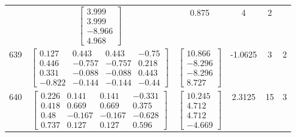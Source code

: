\documentclass[a4paper,12pt]{article}
\begin{document}
\begin{tabular}{c c c c c c}
&
$\begin{bmatrix} 3.999 \\ 3.999 \\ -8.966 \\ 4.968 \end{bmatrix}$
&
0.875
&
4
&
2
\\
639
&
$\begin{bmatrix} 0.127 & 0.443 & 0.443 & -0.75 \\ 0.446 & -0.757 & -0.757 & 0.218 \\ 0.331 & -0.088 & -0.088 & 0.443 \\ -0.822 & -0.144 & -0.144 & -0.44 \end{bmatrix}$
&
$\begin{bmatrix} 10.866 \\ -8.296 \\ -8.296 \\ 8.727 \end{bmatrix}$
&
-1.0625
&
3
&
2
\\
640
&
$\begin{bmatrix} 0.226 & 0.141 & 0.141 & -0.331 \\ 0.418 & 0.669 & 0.669 & 0.375 \\ 0.48 & -0.167 & -0.167 & -0.628 \\ 0.737 & 0.127 & 0.127 & 0.596 \end{bmatrix}$
&
$\begin{bmatrix} 10.245 \\ 4.712 \\ 4.712 \\ -4.669 \end{bmatrix}$
&
2.3125
&
15
&
3
\\
\end{tabular} \egroup \newpage
\end{document}
